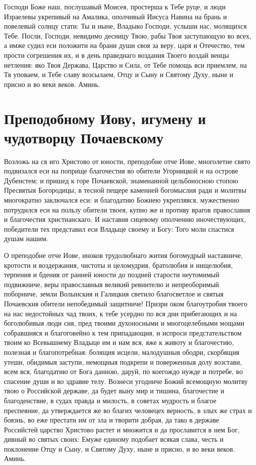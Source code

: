 Господи Боже наш, послушавый Моисея, простерша к Тебе руце, и люди Израелевы укрепивый на Амалика, ополчивый Иисуса Навина на брань и повелевый солнцу стати: Ты и ныне, Владыко Господи, услыши нас, молящихся Тебе. Посли, Господи, невидимо десницу Твою, рабы Твоя заступающую во всех, а имже судил еси положити на брани души своя за веру,  царя и Отечество, тем прости согрешения их, и в день праведнаго воздания Твоего воздай венцы нетления: яко Твоя Держава, Царство и Сила, от Тебе помощь вси приемлем, на Тя уповаем, и Тебе славу возсылаем, Отцу и Сыну и Святому Духу, ныне и присно и во веки веков. Аминь.


\section{Преподобному Иову, игумену и чудотворцу Почаевскому}
 


Возложь на ся иго Христово от юности, преподобне отче Иове, многолетне свято подвизался еси на поприще благочестия во обители Угорницкой и на острове Дубенстем; и пришед к горе Почаевской, знаменанной цельбоносною стопою Пресвятыя Богородицы, в тесной пещере каменней богомыслия ради и молитвы многократно заключался еси: и благодатию Божиею укрепляяся, мужественно потрудился еси на пользу обители твоея, купно же и противу врагов православия и благочестия христианскаго. И наставив сицевому ополчению иночествующих, победители тех представил еси Владыце своему и Богу: Того моли спастися душам нашим.




О преподобне отче Иове, иноков трудолюбнаго жития богомудрый наставниче, кротости и воздержания, чистоты и целомудрия, братолюбия и нищелюбия, терпения и бдения от ранней юности до поздней старости неутомимый подвижниче, веры православныя великий ревнителю и непреоборимый поборниче, земли Волынския и Галицкия светило благосветлое и святыя Почаевския обители непобедимый защитниче! Призри оком благоутробия твоего на нас недостойных чад твоих, к тебе усердно по вся дни прибегающих и на боголюбивыя люди сия, пред твоими духоносными и многоцелебными мощами собравшияся и благоговейно к тем припадающия, и испроси предстательством твоим ко Всевышнему Владыце им и нам вся, яже к животу и благочестию, полезная и благопотребная: болящия исцели, малодушныя ободри, скорбящия утеши, обидимыя заступи, немощныя подкрепи и поверженныя долу возстави, всем вся, благодатию от Бога данною, даруй, по коегождо нужде и потребе, во спасение души и во здравие телу. Вознеси угодниче Божий всемощную молитву твою о Российской державе, да будет выну мир и тишина, благочестие и благоденствие, в судах правда и милость, в советах мудрость и благое преспеяние, да утверждается же во благих человецех верность, в злых же страх и боязнь, во еже престати им от зла и творити добрая, да тако в державе Российстей царство Христово растет и множится и да прославится в нем Бог, дивный во святых своих: Емуже единому подобает всякая слава, честь и поклонение Отцу и Сыну, и Святому Духу, ныне и присно, и во веки веков. Аминь.


